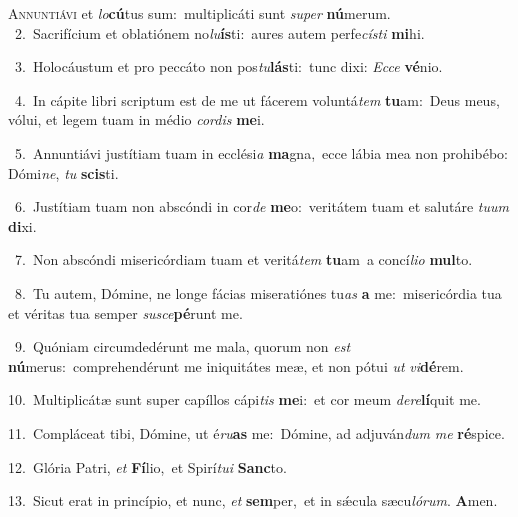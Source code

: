 \lettrine{\initial\textcolor{\initialcolor}{A}}{nnuntiávi} et \textit{lo}\-\textbf{cú}tus sum:~\star multiplicáti sunt \textit{su}\-\textit{per} \textbf{nú}\-merum.\\
{\numbfont\textcolor{\numbcolor}{~2.}}~Sacrifícium et oblatiónem no\-\textit{lu}\-\textbf{ís}ti:~\star aures autem perfe\-\textit{cís}\-\textit{ti} \textbf{mi}\-hi.\par
{\numbfont\textcolor{\numbcolor}{~3.}}~Holocáustum et pro peccáto non pos\-\textit{tu}\-\textbf{lás}ti:~\star tunc dixi: \textit{Ec}\-\textit{ce} \textbf{vé}\-nio.\par
{\numbfont\textcolor{\numbcolor}{~4.}}~In cápite libri scriptum est de me ut fácerem voluntá\textit{tem} \textbf{tu}\-am:~\star Deus meus, vólui, et legem tuam in médio \textit{cor}\-\textit{dis} \textbf{me}\-i.\par
{\numbfont\textcolor{\numbcolor}{~5.}}~Annuntiávi justítiam tuam in ecclési\textit{a} \textbf{ma}\-gna,~\star ecce lábia mea non prohibébo: Dómi\-\textit{ne}\-, \textit{tu} \textbf{scis}\-ti.\par
{\numbfont\textcolor{\numbcolor}{~6.}}~Justítiam tuam non abscóndi in cor\textit{de} \textbf{me}\-o:~\star veritátem tuam et salutáre \textit{tu}\-\textit{um} \textbf{di}\-xi.\par
{\numbfont\textcolor{\numbcolor}{~7.}}~Non abscóndi misericórdiam tuam et veritá\textit{tem} \textbf{tu}\-am~\star a concí\-\textit{li}\-\textit{o} \textbf{mul}\-to.\par
{\numbfont\textcolor{\numbcolor}{~8.}}~Tu autem, Dómine, ne longe fácias miseratiónes tu\textit{as} \textbf{a} me:~\star misericórdia tua et véritas tua semper \textit{su}\-\textit{sce}\textbf{pé}runt me.\par
{\numbfont\textcolor{\numbcolor}{~9.}}~Quóniam circumdedérunt me mala, quorum non \textit{est} \textbf{nú}\-merus:~\star comprehendérunt me iniquitátes meæ, et non pótui \textit{ut} \textit{vi}\-\textbf{dé}rem.\par
{\numbfont\textcolor{\numbcolor}{10.}}~Multiplicátæ sunt super capíllos cápi\textit{tis} \textbf{me}\-i:~\star et cor meum \textit{de}\-\textit{re}\textbf{lí}quit me.\par
{\numbfont\textcolor{\numbcolor}{11.}}~Compláceat tibi, Dómine, ut é\-\textit{ru}\-\textbf{as} me:~\star Dómine, ad adjuván\textit{dum} \textit{me} \textbf{ré}\-spice.\par
{\numbfont\textcolor{\numbcolor}{12.}}~Glória Patri, \textit{et} \textbf{Fí}\-lio,~\star et Spirí\-\textit{tu}\-\textit{i} \textbf{Sanc}\-to.\par
{\numbfont\textcolor{\numbcolor}{13.}}~Sicut erat in princípio, et nunc, \textit{et} \textbf{sem}\-per,~\star et in sǽcula sæcu\-\textit{ló}\-\textit{rum}. \textbf{A}\-men.\par

